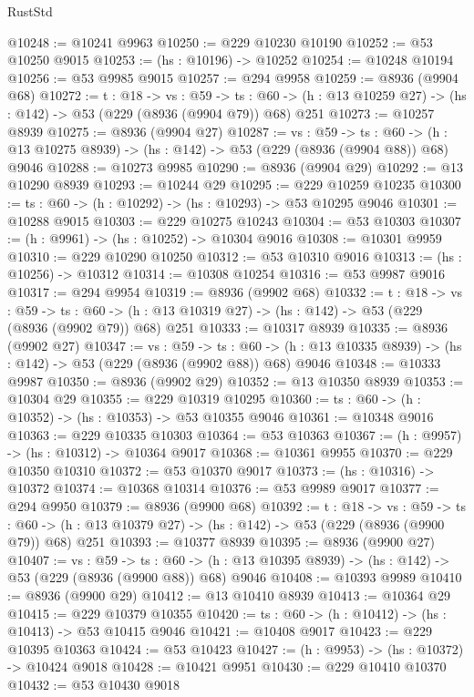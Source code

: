 \begin{lexlean}{RustStd}
\begin{coremodule}
@10248 := @10241 @9963
@10250 := @229 @10230 @10190
@10252 := @53 @10250 @9015
@10253 := (hs : @10196) -> @10252
@10254 := @10248 @10194
@10256 := @53 @9985 @9015
@10257 := @294 @9958
@10259 := @8936 (@9904 @68)
@10272 := {t : @18} ->
  {vs : @59} ->
  {ts : @60} -> (h : @13 @10259 @27) -> (hs : @142) -> @53 (@229 (@8936 (@9904 @79)) @68) @251
@10273 := @10257 @8939
@10275 := @8936 (@9904 @27)
@10287 := {vs : @59} ->
  {ts : @60} -> (h : @13 @10275 @8939) -> (hs : @142) -> @53 (@229 (@8936 (@9904 @88)) @68) @9046
@10288 := @10273 @9985
@10290 := @8936 (@9904 @29)
@10292 := @13 @10290 @8939
@10293 := @10244 @29
@10295 := @229 @10259 @10235
@10300 := {ts : @60} -> (h : @10292) -> (hs : @10293) -> @53 @10295 @9046
@10301 := @10288 @9015
@10303 := @229 @10275 @10243
@10304 := @53 @10303
@10307 := (h : @9961) -> (hs : @10252) -> @10304 @9016
@10308 := @10301 @9959
@10310 := @229 @10290 @10250
@10312 := @53 @10310 @9016
@10313 := (hs : @10256) -> @10312
@10314 := @10308 @10254
@10316 := @53 @9987 @9016
@10317 := @294 @9954
@10319 := @8936 (@9902 @68)
@10332 := {t : @18} ->
  {vs : @59} ->
  {ts : @60} -> (h : @13 @10319 @27) -> (hs : @142) -> @53 (@229 (@8936 (@9902 @79)) @68) @251
@10333 := @10317 @8939
@10335 := @8936 (@9902 @27)
@10347 := {vs : @59} ->
  {ts : @60} -> (h : @13 @10335 @8939) -> (hs : @142) -> @53 (@229 (@8936 (@9902 @88)) @68) @9046
@10348 := @10333 @9987
@10350 := @8936 (@9902 @29)
@10352 := @13 @10350 @8939
@10353 := @10304 @29
@10355 := @229 @10319 @10295
@10360 := {ts : @60} -> (h : @10352) -> (hs : @10353) -> @53 @10355 @9046
@10361 := @10348 @9016
@10363 := @229 @10335 @10303
@10364 := @53 @10363
@10367 := (h : @9957) -> (hs : @10312) -> @10364 @9017
@10368 := @10361 @9955
@10370 := @229 @10350 @10310
@10372 := @53 @10370 @9017
@10373 := (hs : @10316) -> @10372
@10374 := @10368 @10314
@10376 := @53 @9989 @9017
@10377 := @294 @9950
@10379 := @8936 (@9900 @68)
@10392 := {t : @18} ->
  {vs : @59} ->
  {ts : @60} -> (h : @13 @10379 @27) -> (hs : @142) -> @53 (@229 (@8936 (@9900 @79)) @68) @251
@10393 := @10377 @8939
@10395 := @8936 (@9900 @27)
@10407 := {vs : @59} ->
  {ts : @60} -> (h : @13 @10395 @8939) -> (hs : @142) -> @53 (@229 (@8936 (@9900 @88)) @68) @9046
@10408 := @10393 @9989
@10410 := @8936 (@9900 @29)
@10412 := @13 @10410 @8939
@10413 := @10364 @29
@10415 := @229 @10379 @10355
@10420 := {ts : @60} -> (h : @10412) -> (hs : @10413) -> @53 @10415 @9046
@10421 := @10408 @9017
@10423 := @229 @10395 @10363
@10424 := @53 @10423
@10427 := (h : @9953) -> (hs : @10372) -> @10424 @9018
@10428 := @10421 @9951
@10430 := @229 @10410 @10370
@10432 := @53 @10430 @9018

\end{coremodule}
\end{lexlean}
